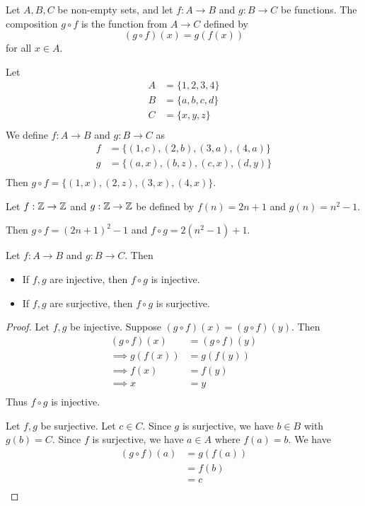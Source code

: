 \documentclass{article}
\begin{document}
    \begin{definition}
      Let $A, B, C$ be non-empty sets, and let $f: A \to B$ and $g: B \to C$ be functions. The composition $g \circ f$ is the function from $A \to C$ defined by
      \[
        (g \circ f)(x) = g(f(x))
      \]
      for all $x \in A$.
    \end{definition}
    \begin{example}
      Let
      \begin{align*}
        A &= \{1, 2, 3, 4\}\\
        B &= \{a, b, c, d\}\\
        C &= \{x, y, z\}\\
      \end{align*}
      We define $f: A \to B$ and $g: B \to C$ as
      \begin{align*}
        f &= \{(1, c), (2, b), (3, a), (4, a)\}\\
        g &= \{(a, x), (b, z), (c, x), (d, y)\}\\
      \end{align*}
      Then $g \circ f = \{(1, x), (2, z), (3, x), (4, x)\}$.
    \end{example}
    \begin{example}
      Let $f: \mathbb{Z} \to \mathbb{Z}$ and $g: \mathbb{Z} \to \mathbb{Z}$ be defined by $f(n) = 2n + 1$ and $g(n) = n^2 - 1$.

      Then $g \circ f = (2n+1)^2 - 1$ and $f \circ g = 2(n^2-1) + 1$.
    \end{example}
    \begin{theorem}
      Let $f: A \to B$ and $g: B \to C$. Then
      \begin{itemize}
        \item If $f, g$ are injective, then $f \circ g$ is injective.
        \item If $f, g$ are surjective, then $f \circ g$ is surjective.
      \end{itemize}
    \end{theorem}
    \begin{proof}
      Let $f, g$ be injective. Suppose $(g \circ f)(x) = (g \circ f)(y)$. Then
      \begin{align*}
        (g \circ f)(x) &= (g \circ f)(y)\\
        \implies g(f(x)) &= g(f(y))\\
        \implies f(x) &= f(y)\\
        \implies x &= y\\
      \end{align*}
      Thus $f \circ g$ is injective.

      Let $f, g$ be surjective. Let $c \in C$. Since $g$ is surjective, we have $b \in B$ with $g(b) =C$. Since $f$ is surjective, we have $a \in A$ where $f(a)  =b$. We have
      \begin{align*}
        (g \circ f)(a) &= g(f(a))\\
        &= f(b)\\
        &= c\\
      \end{align*}
    \end{proof}
\end{document}
